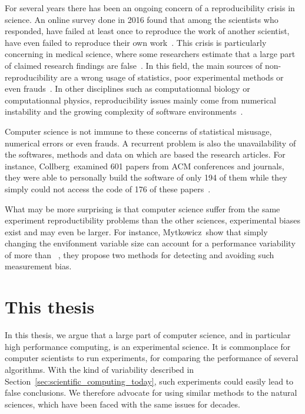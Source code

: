             For several years there has been an ongoing concern of a reproducibility crisis in science. An online survey
            done in 2016 found that among the  scientists who responded,  have failed at
            least once to reproduce the work of another scientist,  have even failed to reproduce
            their own work~\cite{nature_survey}. This crisis is particularly concerning in medical science, where some
            researchers estimate that a large part of claimed research findings are
            false~\cite{Ioannidis_2005,freedman}. In this field, the main sources of non-reproducibility are a wrong
            usage of statistics, poor experimental methods or even frauds~\cite{science_misconduct}. In other
            disciplines such as computationnal biology or computationnal physics, reproducibility issues mainly come
            from numerical instability and the growing complexity of software environments~\cite{dong2021}.

            Computer science is not immune to these concerns of statistical misusage, numerical errors or even frauds.
            A recurrent problem is also the unavailability of the softwares, methods and data on which are based the
            research articles. For instance, Collberg~\etal examined 601 papers from ACM conferences and journals, they
            were able to personally build the software of only 194 of them while they simply could not access the code
            of 176 of these papers~\cite{collberg2015repeatability}.

            What may be more surprising is that computer science suffer from the same experiment reproductibility
            problems than the other sciences, experimental biases exist and may even be larger. For instance,
            Mytkowicz~\etal show that simply changing the envifonment variable size can account for a performance
            variability of more than ~\cite{Mytkowicz_2009}, they propose two methods for detecting
            and avoiding such measurement bias.

    \section{This thesis}%
    \label{sec:this_thesis}

        In this thesis, we argue that a large part of computer science, and in particular high performance computing, is
        an experimental science. It is commonplace for computer scientists to run experiments, \eg for comparing the
        performance of several algorithms. With the kind of variability described in
        Section~\ref{sec:scientific_computing_today}, such experiments could easily lead to false conclusions. We
        therefore advocate for using similar methods to the natural sciences, which have been faced with the same issues
        for decades.


